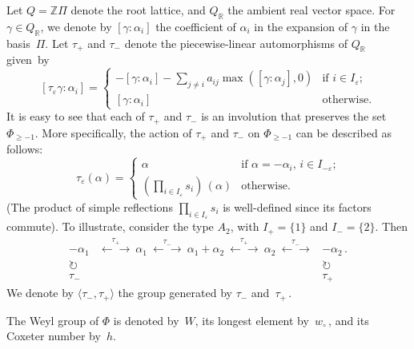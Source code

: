 \documentclass[letterpaper]{amsart}
\numberwithin{equation}{section}
\theoremstyle{definition}
\def\ZZ{\mathbb{Z}}
\def\RR{\mathbb{R}}
\def\verylongleftrightarrow{\longleftarrow\!\!\!\longrightarrow}
\begin{document}
Let $Q = \ZZ \Pi$ denote the root lattice, 
and $Q_\RR$ the ambient real vector space. 
For $\gamma \!\in\! Q_\RR$, we denote by $[\gamma : \alpha_i]$ 
the coefficient of $\alpha_i$ in the expansion of $\gamma$ in the 
basis~$\Pi$. 
Let $\tau_+$ and $\tau_-$ denote the piecewise-linear 
automorphisms of $Q_\RR$ given~by 
\begin{equation} 
\label{eq:tau-pm-tropical} 
[\tau_\varepsilon  \gamma: \alpha_i] = 
\begin{cases} 
- [\gamma: \alpha_i] - \sum_{j \neq i}  a_{ij} \max ([\gamma: \alpha_j], 0) 
& 
\text{if $i \in I_\varepsilon$;} \\{} 
[\gamma: \alpha_i] & \text{otherwise.} 
\end{cases} 
\end{equation} 
It is easy to see that each of $\tau_+$ and $\tau_-$ is an involution 
that preserves the set $\Phi_{\geq -1}$. 
More specifically, the action of $\tau_+$ and $\tau_-$ on $\Phi_{\geq -1}$ 
can be described as follows: 
\begin{equation} 
\label{eq:tau-pm-on-roots} 
\tau_\varepsilon(\alpha) = 
\begin{cases} 
\displaystyle 
\alpha & \text{if $\alpha = - \alpha_i, \, i \in I_{- \varepsilon}$;}\\ 
(\prod_{i \in I_\varepsilon} s_i) \,(\alpha) & \text{otherwise.} 
\end{cases} 
\end{equation} 
(The product of simple reflections $\prod_{i \in I_\varepsilon} s_i$ is well-defined since 
its factors commute). 
To illustrate, consider the type $A_2$, with $I_+=\{1\}$ and $I_-=\{2\}$. 
Then 
\begin{equation} 
\label{eq:A2-tau-tropical} 
\begin{array}{ccc} 
-\alpha_1 & \stackrel{\textstyle\tau_+}{\verylongleftrightarrow} 
~\alpha_1~ \stackrel{\textstyle\tau_-}{\verylongleftrightarrow} 
~\alpha_1\!+\!\alpha_2~ 
\stackrel{\textstyle\tau_+}{\verylongleftrightarrow} ~\alpha_2~ 
\stackrel{\textstyle\tau_-}{\verylongleftrightarrow} 
& -\alpha_2\,. \\%
\circlearrowright & & \circlearrowright \\ \tau_- & & \tau_+ 
\end{array} 
\end{equation} 
We denote by $\langle\tau_-,\tau_+\rangle$  the group generated by 
$\tau_-$ and~$\tau_+\,$. 
 
The Weyl group of $\Phi$ is denoted by~$W$, its longest element 
by~$w_\circ\,$, and its Coxeter number by~$h$. 
 
\end{document}

